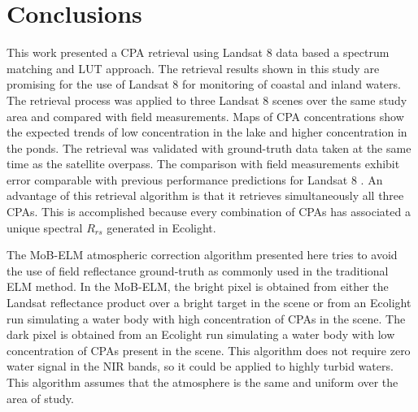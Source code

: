 \documentclass[onecolumn,3p,letterpaper]{elsarticle}
\begin{document}
\section{Conclusions}
This work presented a CPA retrieval using Landsat 8 data based a spectrum matching and LUT approach. The retrieval results shown in this study are promising for the use of Landsat 8 for monitoring of coastal and inland waters. The retrieval process was applied to three Landsat 8 scenes over the same study area and compared with field measurements. Maps of CPA concentrations show the expected trends of low concentration in the lake and higher concentration in the ponds. The retrieval was validated with ground-truth data taken at the same time as the satellite overpass. The comparison with field measurements exhibit error comparable with previous performance predictions for Landsat 8 \citep{Gerace:2013}. An advantage of this retrieval algorithm is that it retrieves simultaneously all three CPAs. This is accomplished because every combination of CPAs has associated a unique spectral $R_{rs}$ generated in Ecolight.

The MoB-ELM atmospheric correction algorithm presented here tries to avoid the use of field reflectance ground-truth as commonly used in the traditional ELM method. In the MoB-ELM, the bright pixel is obtained from either the Landsat reflectance product over a bright target in the scene or from an Ecolight run simulating a water body with high concentration of CPAs in the scene. The dark pixel is obtained from an Ecolight run simulating a water body with low concentration of CPAs present in the scene. This algorithm does not require zero water signal in the NIR bands, so it could be applied to highly turbid waters. This algorithm assumes that the atmosphere is the same and uniform over the area of study.

\end{document}
